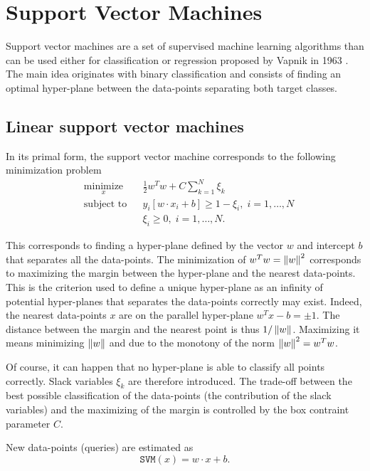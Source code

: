 \section{Support Vector Machines}
Support vector machines are a set of supervised machine learning algorithms than can be used either for classification or regression proposed by Vapnik in 1963 \cite{VapLer63}. The main idea originates with binary classification and consists of finding an optimal hyper-plane between the data-points separating both target classes.

\subsection{Linear support vector machines}
In its primal form, the support vector machine corresponds to the following minimization problem
\begin{equation}
    \begin{aligned}
& \underset{x}{\text{minimize}} 
& & \frac{1}{2}w^Tw + C \sum_{k=1}^N \xi_k \\
& \text{subject to}
& & y_i\left[ w \cdot x_i+b \right] \geq 1-\xi_i, \; i = 1, \ldots, N \\
& 
& & \xi_i \geq 0, \; i = 1, \ldots, N.
\end{aligned}
\end{equation}

This corresponds to finding a hyper-plane defined by the vector $w$ and intercept $b$ that separates all the data-points. The minimization of $w^Tw = \left\lVert w\right\rVert^2$ corresponds to maximizing the margin between the hyper-plane and the nearest data-points. This is the criterion used to define a unique hyper-plane as an infinity of potential hyper-planes that separates the data-points correctly may exist. Indeed, the nearest data-points $x$ are on the parallel hyper-plane $w^Tx-b= \pm 1$. The distance between the margin and the nearest point is thus $1/\left\lVert w\right\rVert$. Maximizing it means minimizing $\left\lVert w\right\rVert$ and due to the monotony of the norm $\left\lVert w\right\rVert^2 = w^Tw$.

Of course, it can happen that no hyper-plane is able to classify all points correctly. Slack variables $\xi_k$ are therefore introduced. The trade-off between the best possible classification of the data-points (the contribution of the slack variables) and the maximizing of the margin is controlled by the box contraint parameter $C$.

New data-points (queries) are estimated as
\begin{equation}
    \mathtt{SVM}(x) = w \cdot x + b.
\end{equation}


